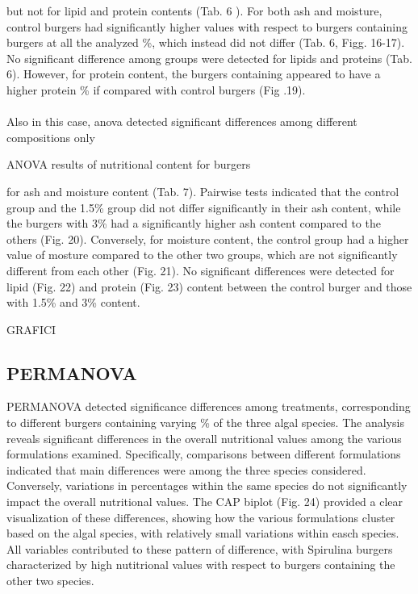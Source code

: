 but not for lipid and protein contents (Tab. 6 ). For both ash and moisture, control burgers had significantly higher values with respect to burgers containing  burgers at all the analyzed \%, which instead did not differ (Tab. 6, Figg. 16-17). No significant difference among groups were detected for lipids and proteins (Tab. 6). However, for protein content, the burgers containing  appeared to have a higher protein \% if compared with control burgers (Fig .19).



\paragraph{}
Also in this case, \gls{anova} detected significant differences among different compositions only

\begin{table}[H]
	\caption{ANOVA results of nutritional content for  burgers}
	\label{tab:anova-palmaria}
	\centering
	\scriptsize
	
\end{table}

for ash and moisture content (Tab. 7). Pairwise tests indicated that the control group and the 1.5\% group did not differ significantly in their ash content, while the burgers with 3\%  had a significantly higher ash content compared to the others (Fig. 20). Conversely, for moisture content, the control group had a higher value of mosture compared to the other two groups, which are not significantly different from each other (Fig. 21). No significant differences were detected for lipid (Fig. 22) and protein (Fig. 23) content between the control burger and those with 1.5\% and 3\% content.



GRAFICI

\subsection{PERMANOVA}
PERMANOVA detected significance differences among treatments, corresponding to different burgers containing varying \% of the three algal species. The analysis reveals significant differences in the overall nutritional values among the various formulations examined. Specifically, comparisons between different formulations indicated that main differences were among the three species considered. Conversely, variations in percentages within the same species do not significantly impact the overall nutritional values.
The CAP biplot (Fig. 24) provided a clear visualization of these differences, showing how the various formulations cluster based on the algal species, with relatively small variations within easch species. All variables contributed to these pattern of difference, with Spirulina burgers characterized by high nutitrional values with respect to burgers containing the other two species.

